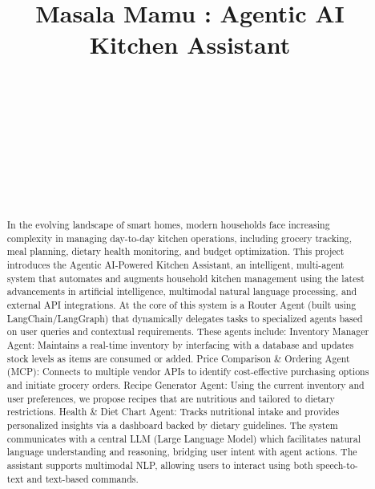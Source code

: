 \documentclass{ecai}
\begin{document}

\begin{frontmatter}




\title{Masala Mamu : Agentic AI Kitchen Assistant}

\author[A,B]{~}
\author[A,B]{~}
\author[A,B]{~}
\author[A,B]{~}
\author[A,B]{~}
\address[A]{Division of Interdisciplinary Sciences}
\address[B]{Indian Institute of Science, Bangalore}

\begin{abstract}
In the evolving landscape of smart homes, modern households face increasing complexity in managing day-to-day kitchen operations, including grocery tracking, meal planning, dietary health monitoring, and budget optimization. This project introduces the Agentic AI-Powered Kitchen Assistant, an intelligent, multi-agent system that automates and augments household kitchen management using the latest advancements in artificial intelligence, multimodal natural language processing, and external API integrations. At the core of this system is a Router Agent (built using LangChain/LangGraph) that dynamically delegates tasks to specialized agents based on user queries and contextual requirements. These agents include:
Inventory Manager Agent: Maintains a real-time inventory by interfacing with a database and updates stock levels as items are consumed or added. Price Comparison \& Ordering Agent (MCP): Connects to multiple vendor APIs to identify cost-effective purchasing options and initiate grocery orders. Recipe Generator Agent: Using the current inventory and user preferences, we propose recipes that are nutritious and tailored to dietary restrictions. Health \& Diet Chart Agent: Tracks nutritional intake and provides personalized insights via a dashboard backed by dietary guidelines.
The system communicates with a central LLM (Large Language Model) which facilitates natural language understanding and reasoning, bridging user intent with agent actions. The assistant supports multimodal NLP, allowing users to interact using both speech-to-text and text-based commands.


\end{abstract}
\end{frontmatter}
\end{document}
